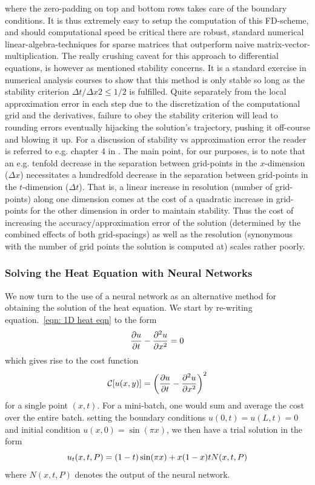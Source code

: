 \documentclass[reprint, english, nofootinbib]{revtex4-2}
\begin{document}
where the zero-padding on top and bottom rows takes care of the boundary conditions. It is thus extremely easy to setup the computation of this FD-scheme, and should computational speed be critical there are robust, standard numerical linear-algebra-techniques for sparse matrices that outperform naive matrix-vector-multiplication. The really crushing caveat for this approach to differential equations, is however as mentioned stability concerns. It is a standard exercise in numerical analysis courses to show that this method is only stable so long as the stability criterion $\Delta t/\Delta x2 \leq 1/2$ is fulfilled. Quite separately from the local approximation error in each step due to the discretization of the computational grid and the derivatives, failure to obey the stability criterion will lead to rounding errors eventually hijacking the solution's trajectory, pushing it off-course and blowing it up. For a discussion of stability vs approximation error the reader is referred to e.g. chapter 4 in \cite{Iserles}. The main point, for our purposes, is to note that an e.g. tenfold decrease in the separation between grid-points in the $x$-dimension ($\Delta x$) necessitates a hundredfold decrease in the separation between grid-points in the $t$-dimension ($\Delta t$). That is, a linear increase in resolution (number of grid-points) along one dimension comes at the cost of a quadratic increase in grid-points for the other dimension in order to maintain stability. Thus the cost of increasing the accuracy/approximation error of the solution (determined by the combined effects of both grid-spacings) as well as the resolution (synonymous with the number of grid points the solution is computed at) scales rather poorly.

\subsubsection{Solving the Heat Equation with Neural Networks}
\noindent
We now turn to the use of a neural network as an alternative method for obtaining the solution of the heat equation. We start by re-writing equation.~\ref{eqn: 1D heat eqn} to the form
\begin{equation}
    \pdv{u}{t} - \pdv[2]{u}{x} = 0
\end{equation}
which gives rise to the cost function 
\begin{equation}
    \mathcal C\qty[u\qty(x, y)] = \qty(\pdv{u}{t} - \pdv[2]{u}{x})^2
\end{equation}
for a single point $(x,t)$. For a mini-batch, one would sum and average the cost over the entire batch.
setting the boundary conditions $u(0, t) = u(L, t) = 0$ and initial condition $u(x, 0) = \sin(\pi x)$, we then have a trial solution in the form
\begin{equation}
    u_t(x, t, P) = \qty(1 - t)\sin(\pi x) + x(1 - x)t N(x, t, P)
\end{equation}
where $N(x, t, P)$ denotes the output of the neural network.
\end{document}
